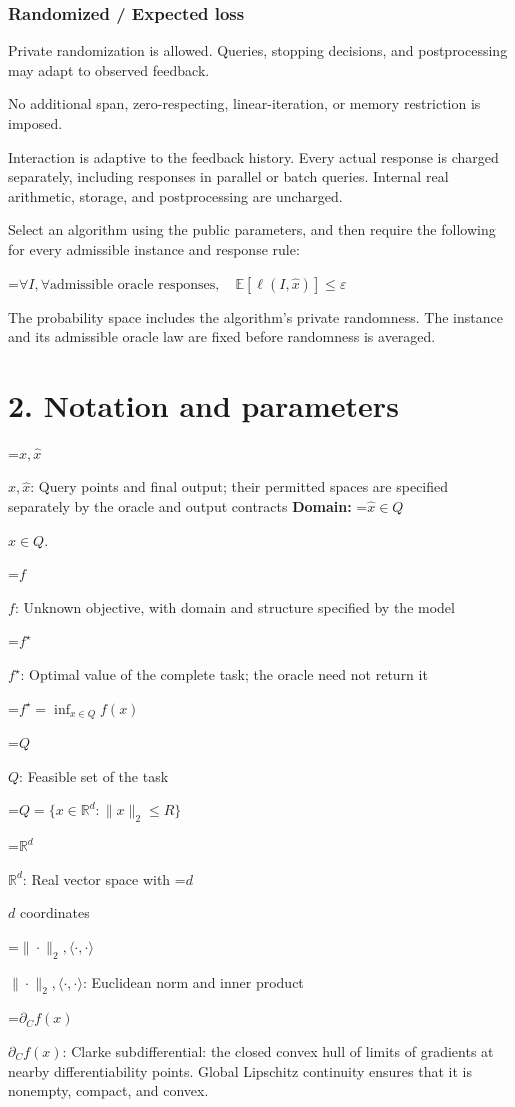 \documentclass[10pt,a4paper]{article}
\newcommand{\AtlasMath}[1]{\par\begingroup\centering\setbox0=\hbox{$\displaystyle #1$}\ifdim\wd0>1.4\linewidth\typeout{ATLAS WIDE FORMULA: \the\wd0}\fi\ifdim\wd0>\linewidth\resizebox{\linewidth}{!}{\box0}\else\box0\fi\par\endgroup}
\newcommand{\AtlasInlineMath}[1]{\begingroup\setbox0=\hbox{$#1$}\ifdim\wd0>.4\linewidth\endgroup\AtlasMath{#1}\else\endgroup$#1$\fi}
\begin{document}
\subsubsection{Randomized / Expected loss}
Private randomization is allowed. Queries, stopping decisions, and postprocessing may adapt to observed feedback.

No additional span, zero-respecting, linear-iteration, or memory restriction is imposed.

Interaction is adaptive to the feedback history. Every actual response is charged separately, including responses in parallel or batch queries. Internal real arithmetic, storage, and postprocessing are uncharged.

Select an algorithm using the public parameters, and then require the following for every admissible instance and response rule:


\AtlasMath{\forall I,\forall\text{admissible oracle responses},\quad\mathbb{E}[\ell(I,\widehat{x})]\le\varepsilon}


The probability space includes the algorithm's private randomness. The instance and its admissible oracle law are fixed before randomness is averaged.

\section{2. Notation and parameters}
\AtlasInlineMath{x,\widehat{x}}: Query points and final output; their permitted spaces are specified separately by the oracle and output contracts \textbf{Domain:} \AtlasInlineMath{\widehat{x}\in Q}.

\AtlasInlineMath{f}: Unknown objective, with domain and structure specified by the model

\AtlasInlineMath{f^\star}: Optimal value of the complete task; the oracle need not return it


\AtlasMath{f^\star=\inf_{x\in Q}f(x)}


\AtlasInlineMath{Q}: Feasible set of the task


\AtlasMath{Q=\{x\in\mathbb{R}^d:\|x\|_2\le R\}}


\AtlasInlineMath{\mathbb{R}^d}: Real vector space with \AtlasInlineMath{d} coordinates

\AtlasInlineMath{\|\cdot\|_2,\langle\cdot,\cdot\rangle}: Euclidean norm and inner product

\AtlasInlineMath{\partial_C f(x)}: Clarke subdifferential: the closed convex hull of limits of gradients at nearby differentiability points. Global Lipschitz continuity ensures that it is nonempty, compact, and convex.
\end{document}
